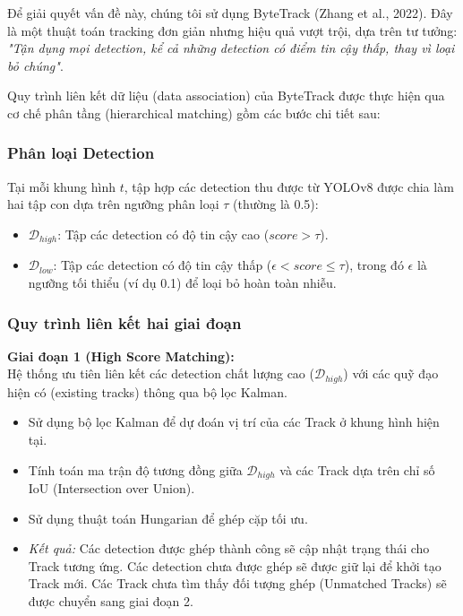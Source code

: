 Để giải quyết vấn đề này, chúng tôi sử dụng ByteTrack (Zhang et al., 2022). Đây là một thuật toán tracking đơn giản nhưng hiệu quả vượt trội, dựa trên tư tưởng: \textit{"Tận dụng mọi detection, kể cả những detection có điểm tin cậy thấp, thay vì loại bỏ chúng"}.

Quy trình liên kết dữ liệu (data association) của ByteTrack được thực hiện qua cơ chế phân tầng (hierarchical matching) gồm các bước chi tiết sau:

\subsubsection{Phân loại Detection}
Tại mỗi khung hình $t$, tập hợp các detection thu được từ YOLOv8 được chia làm hai tập con dựa trên ngưỡng phân loại $\tau$ (thường là 0.5):
\begin{itemize}
    \item $\mathcal{D}_{high}$: Tập các detection có độ tin cậy cao ($score > \tau$).
    \item $\mathcal{D}_{low}$: Tập các detection có độ tin cậy thấp ($\epsilon < score \le \tau$), trong đó $\epsilon$ là ngưỡng tối thiểu (ví dụ 0.1) để loại bỏ hoàn toàn nhiễu.
\end{itemize}

\subsubsection{Quy trình liên kết hai giai đoạn}

\textbf{Giai đoạn 1 (High Score Matching):} \\
Hệ thống ưu tiên liên kết các detection chất lượng cao ($\mathcal{D}_{high}$) với các quỹ đạo hiện có (existing tracks) thông qua bộ lọc Kalman.
\begin{itemize}
    \item Sử dụng bộ lọc Kalman để dự đoán vị trí của các Track ở khung hình hiện tại.
    \item Tính toán ma trận độ tương đồng giữa $\mathcal{D}_{high}$ và các Track dựa trên chỉ số IoU (Intersection over Union).
    \item Sử dụng thuật toán Hungarian để ghép cặp tối ưu.
    \item \textit{Kết quả:} Các detection được ghép thành công sẽ cập nhật trạng thái cho Track tương ứng. Các detection chưa được ghép sẽ được giữ lại để khởi tạo Track mới. Các Track chưa tìm thấy đối tượng ghép (Unmatched Tracks) sẽ được chuyển sang giai đoạn 2.
\end{itemize}


